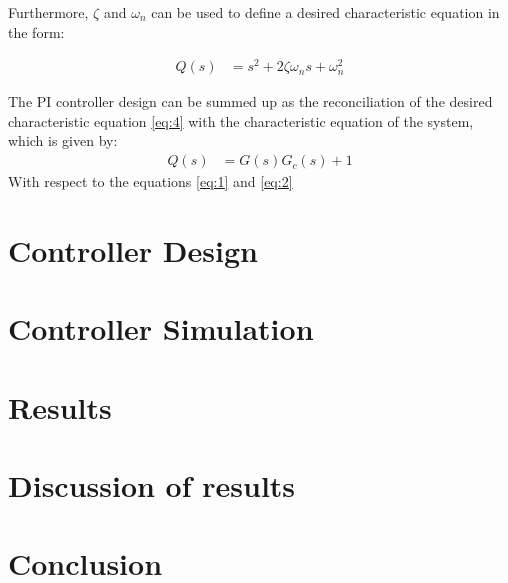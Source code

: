 Furthermore, $\zeta$ and $\omega_n$ can be used to define a desired characteristic equation in the form:

\begin{align} \label{eq:4}
Q(s) &= s^2 + 2\zeta\omega_ns + \omega_n^2
\end{align}

The PI controller design can be summed up as the reconciliation of the desired characteristic equation \ref{eq:4} with the characteristic equation of the system, which is given by:
\begin{align}\label{eq:5}
Q(s) &= G(s)G_c(s) + 1 
\end{align}
With respect to the equations \ref{eq:1} and \ref{eq:2}



\chapter{Controller Design}
\chapter{Controller Simulation}
\chapter{Results}
\chapter{Discussion of results}
\chapter{Conclusion}


